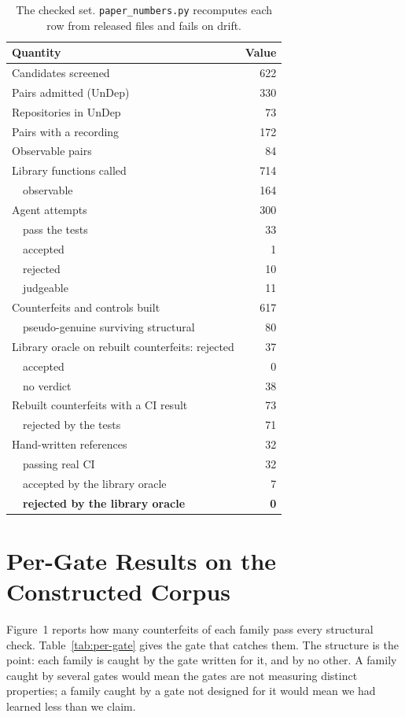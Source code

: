 \begin{table}[t]
\centering\small
\begin{tabular}{@{}lr@{}}
\toprule
Quantity & Value \\
\midrule
Candidates screened & 622 \\
Pairs admitted (UnDep) & 330 \\
Repositories in UnDep & 73 \\
Pairs with a recording & 172 \\
Observable pairs & 84 \\
Library functions called & 714 \\
\ \ observable & 164 \\
Agent attempts & 300 \\
\ \ pass the tests & 33 \\
\ \ accepted & 1 \\
\ \ rejected & 10 \\
\ \ judgeable & 11 \\
Counterfeits and controls built & 617 \\
\ \ pseudo-genuine surviving structural & 80 \\
Library oracle on rebuilt counterfeits: rejected & 37 \\
\ \ accepted & 0 \\
\ \ no verdict & 38 \\
Rebuilt counterfeits with a CI result & 73 \\
\ \ rejected by the tests & 71 \\
Hand-written references & 32 \\
\ \ passing real CI & 32 \\
\ \ accepted by the library oracle & 7 \\
\ \ \textbf{rejected by the library oracle} & \textbf{0} \\
\bottomrule
\end{tabular}
\caption{The checked set. \texttt{paper\_numbers.py} recomputes each row
from released files and fails on drift.}
\label{tab:checked-numbers}
\end{table}

\section{Per-Gate Results on the Constructed Corpus}
\label{app:per-gate}

Figure~1 reports how many counterfeits of each family pass every
structural check. Table~\ref{tab:per-gate} gives the gate that catches
them. The structure is the point: each family is caught by the gate
written for it, and by no other. A family caught by several gates would
mean the gates are not measuring distinct properties; a family caught by
a gate not designed for it would mean we had learned less than we claim.

